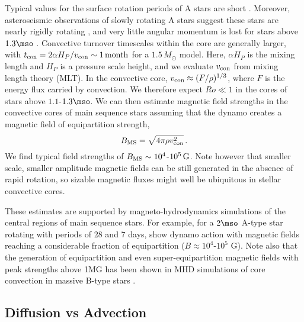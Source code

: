 Typical values for the surface rotation periods of A stars are short \citep[about 1 day, see e.g.][]{Zorec_2012}. 
Moreover, asteroseismic observations of slowly rotating A stars suggest these stars are nearly rigidly rotating \citep{Kurtz_2014}, and very little angular momentum is lost for stars above $1.3\mso$ \citep[Kraft break, see e.g.][]{1967ApJ...150..551K,2013ApJ...776...67V}. 
Convective turnover timescales within the core are generally larger, with $t_{\rm con} = 2 \alpha H_P/v_{\rm con} \sim 1 \, {\rm month}$ for a $1.5 \, M_\odot$ model. Here, $\alpha H_P$ is the mixing length and $H_P$ is a pressure scale height, and we evaluate $v_{\rm con}$ from mixing length theory (MLT). In the convective core, $v_{\rm con} \approx (F/\rho)^{1/3}$, where $F$ is the energy flux carried by convection.
We therefore expect $Ro \ll 1$ in the cores of stars above $1.1$-$1.3\mso$. 
We can then estimate magnetic field strengths in the convective cores of main sequence stars assuming that the dynamo creates a magnetic field of equipartition strength,
\begin{equation}
\label{eqn:Beq}
B_{\rm MS} = \sqrt{ 4 \pi \rho v_{\rm con}^2} \, .
\end{equation}
We find typical field strengths of $B_{\rm MS} \sim 10^4$-$10^5 \, {\rm G}$. Note however that smaller scale, smaller amplitude magnetic fields can be still generated in the absence of rapid rotation, so sizable magnetic fluxes might well be ubiquitous in stellar convective cores. 

These estimates are supported by magneto-hydrodynamics simulations of the central regions of main sequence stars. For example, for a $2\mso$ A-type star rotating with periods of 28 and 7 days, \citet{Brun_2005}
show dynamo action with magnetic fields reaching a considerable fraction of equipartition ($B \approx 10^4$-$10^5$ G). 
Note also that the generation of equipartition and even super-equipartition magnetic fields with peak strengths above 1MG has been shown in MHD simulations of core convection in massive B-type stars \cite{2013PhDT.......388A}.




\subsection{Diffusion vs Advection}
\label{time}

